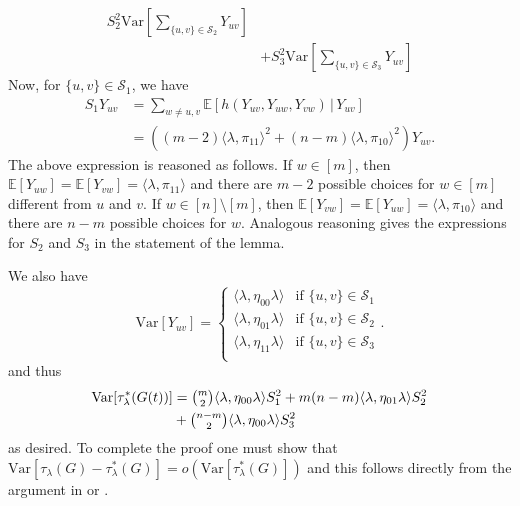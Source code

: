 \documentclass[10pt,journal,compsoc]{IEEEtran}
\theoremstyle{definition}
\begin{document}
\begin{IEEEproof}[Lemma~3]
\begin{equation}
\begin{split}
  S_2^{2}
  \mathrm{Var}[\sum_{\{u,v\} \in \mathcal{S}_2} Y_{uv}] \\ &+
  S_3^{2}
  \mathrm{Var}[\sum_{\{u,v\} \in \mathcal{S}_3} Y_{uv}] 
  \end{split}
\end{equation}
Now, for $\{u,v\} \in \mathcal{S}_1$, we have
\begin{equation}
  \label{eq:58}
  \begin{split}
S_1 Y_{uv} &=\sum_{w \not = u,v} \mathbb{E}[h(Y_{uv}, Y_{uw}, Y_{vw})
\, | \, Y_{uv}] \\
 &= ((m-2) \langle \lambda, \pi_{11} \rangle^{2} + (n-m)
    \langle \lambda, \pi_{10} \rangle^{2})Y_{uv}.
  \end{split}
\end{equation}
The above expression is reasoned as follows. If $w \in [m]$, then
$\mathbb{E}[Y_{uw}] = \mathbb{E}[Y_{vw}] = \langle \lambda,
\pi_{11} \rangle$ and there are $m-2$ possible choices for $w \in [m]$
different from $u$ and $v$. If $w \in [n] \setminus [m]$, then
$\mathbb{E}[Y_{vw}] = \mathbb{E}[Y_{uw}] = \langle \lambda, \pi_{10}
\rangle$ and there are $n - m$ possible choices for $w$. Analogous
reasoning gives the expressions for $S_2$ and $S_3$ in the statement
of the lemma. 

We also have
 \begin{equation}
   \label{eq:56}
   \mathrm{Var}[Y_{uv}] = \begin{cases}
     \langle \lambda, \eta_{00} \lambda \rangle & \text{if $\{u,v\} \in
       \mathcal{S}_1$} \\
     \langle \lambda, \eta_{01} \lambda \rangle & \text{if $\{u,v\} \in
       \mathcal{S}_2$} \\
     \langle \lambda, \eta_{11} \lambda \rangle & \text{if $\{u,v\} \in
       \mathcal{S}_3$} \\
     \end{cases}.
 \end{equation}
and thus
\begin{equation*}
  \begin{split}
    \mathrm{Var}[\tau_{\lambda}^{*}(G(t))] &=
    \tbinom{m}{2} \langle \lambda, \eta_{00} \lambda \rangle S_1^{2} +
    m(n-m) \langle \lambda, \eta_{01} \lambda \rangle S_2^{2} \\ &+
    \tbinom{n-m}{2} \langle \lambda, \eta_{00} \lambda \rangle S_3^{2}
  \end{split}
\end{equation*}
as desired. To complete the proof one must show that
$\mathrm{Var}[\tau_{\lambda}(G) - \tau_{\lambda}^{*}(G)] =
o(\mathrm{Var}[\tau_{\lambda}^{*}(G)])$ and this follows directly from
the argument in \cite{nowicki88:_subgr_u_statis_method}
or \cite{rukhin09:_asymp_analy_various_statis_random_graph_infer}.
\end{IEEEproof}
\end{document}
